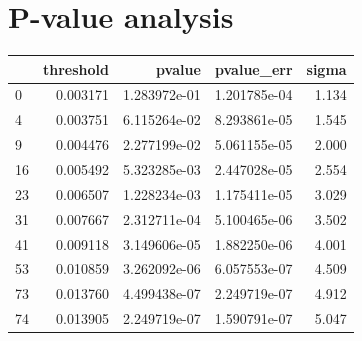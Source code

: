 \section{P-value analysis}
\label{s:appendix-a}

\begin{tabular}{lrrrr}
\toprule
{} &  threshold &        pvalue &    pvalue\_err &  sigma \\
\midrule
0  &   0.003171 &  1.283972e-01 &  1.201785e-04 &  1.134 \\
4  &   0.003751 &  6.115264e-02 &  8.293861e-05 &  1.545 \\
9  &   0.004476 &  2.277199e-02 &  5.061155e-05 &  2.000 \\
16 &   0.005492 &  5.323285e-03 &  2.447028e-05 &  2.554 \\
23 &   0.006507 &  1.228234e-03 &  1.175411e-05 &  3.029 \\
31 &   0.007667 &  2.312711e-04 &  5.100465e-06 &  3.502 \\
41 &   0.009118 &  3.149606e-05 &  1.882250e-06 &  4.001 \\
53 &   0.010859 &  3.262092e-06 &  6.057553e-07 &  4.509 \\
73 &   0.013760 &  4.499438e-07 &  2.249719e-07 &  4.912 \\
74 &   0.013905 &  2.249719e-07 &  1.590791e-07 &  5.047 \\
\bottomrule
\end{tabular}


